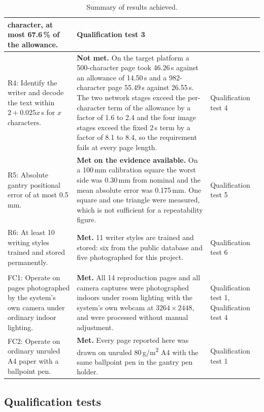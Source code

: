\begin{table}[h]
\begin{tabularx}{\linewidth}{|>{\raggedright\arraybackslash}p{4.3cm}|>{\raggedright\arraybackslash}X|>{\raggedright\arraybackslash}p{2.2cm}|}
character, at most 67.6\,\% of the allowance. &
Qualification test 3 \\
\hline
R4: Identify the writer and decode the text within $2+0.025x$\,s for $x$
characters. &
\textbf{Not met.} On the target platform a 500-character page took 46.26\,s
against an allowance of 14.50\,s and a 982-character page 55.49\,s against
26.55\,s. The two network stages exceed the per-character term of the allowance
by a factor of 1.6 to 2.4 and the four image stages exceed the fixed 2\,s term
by a factor of 8.1 to 8.4, so the requirement fails at every page length. &
Qualification test 4 \\
\hline
R5: Absolute gantry positional error of at most 0.5\,mm. &
\textbf{Met on the evidence available.} On a 100\,mm calibration square the
worst side was 0.30\,mm from nominal and the mean absolute error was 0.175\,mm.
One square and one triangle were measured, which is not sufficient for a
repeatability figure. &
Qualification test 5 \\
\hline
R6: At least 10 writing styles trained and stored permanently. &
\textbf{Met.} 11 writer styles are trained and stored: six from the public
database and five photographed for this project. &
Qualification test 6 \\
\hline
\multicolumn{3}{|l|}{\textbf{Field condition requirements and specifications}} \\
\hline
FC1: Operate on pages photographed by the system's own camera under ordinary
indoor lighting. &
\textbf{Met.} All 14 reproduction pages and all camera captures were
photographed indoors under room lighting with the system's own webcam at
$3264\times2448$, and were processed without manual adjustment. &
Qualification test 1, Qualification test 4 \\
\hline
FC2: Operate on ordinary unruled A4 paper with a ballpoint pen. &
\textbf{Met.} Every page reported here was drawn on unruled 80\,g/m\textsuperscript{2}
A4 with the same ballpoint pen in the gantry pen holder. &
Qualification test 1 \\
\hline
\end{tabularx}
\caption{Summary of results achieved.}
\label{tab:res-summary}
\end{table}

\subsection{Qualification tests} %
\label{sec:res-qtp}

